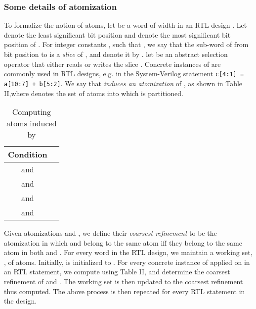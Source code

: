 \documentclass{llncs}
\begin{document}
\subsubsection{Some details of atomization}
To formalize the notion of atoms, let  be a word of width  in an
RTL design .  Let  denote the least significant bit position and
 denote the most significant bit position of .  For integer
constants ,  such that , we say that the
sub-word of  from bit position  to  is a \emph{slice} of ,
and denote it by .  let  be an abstract
selection operator that either reads or writes the slice .
Concrete instances of  are commonly used in RTL
designs, e.g. in the System-Verilog statement {\tt c[4:1] = a[10:7] +
  b[5:2]}. We say that  \emph{induces an
  atomization} of , as shown in Table II,where
 denotes the set of atoms into which  is partitioned.
\begin{table}
\begin{center}
\begin{tabular}{|c|c|}
\hline
{\bfseries Condition} & {\bfseries } \\
\hline
 and  &  \\
\hline
 and  &  \\
\hline
 and  & \\
\hline
 and  & \\
\hline
\end{tabular}
\caption{Computing atoms induced by }
\end{center}
\end{table}\label{atoms}

Given atomizations  and , we
define their \emph{coarsest refinement} to be the atomization in which
 and  belong to the same atom iff they belong
to the same atom in both  and
.  For every word  in the RTL
design, we maintain a working set, , of atoms.
Initially,  is initialized to .
For every concrete instance of  applied on  in an RTL
statement, we compute  using Table II, and
determine the coarsest refinement of  and
.  The working set  is
then updated to the coarsest refinement thus computed.  The above
process is then repeated for every RTL statement in the design.
\end{document}
